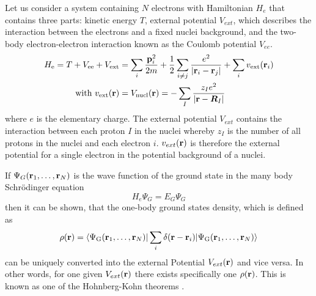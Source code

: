 	Let us consider a system containing $N$ electrons 
	with Hamiltonian $H_e$ 
	that contains three parts: kinetic energy $T$, external potential $V_{ext}$, which describes the interaction between the electrons and a fixed nuclei background, and the two-body electron-electron interaction known as the Coulomb potential $V_{ee}$.
	\begin{align}
		H_\text{e} = T + V_{\text{ee}} + V_{\text{ext}} &= \sum_i \frac{\textbf{p}^2_i}{2m} +
		\frac{1}{2} \sum_{i\neq j} \frac{e^2}{|\textbf{r}_i - \textbf{r}_j|} + \sum_i v_{\text{ext}}(\textbf{r}_i) \\
		\text{with} ~v_{\text{ext}}(\textbf{r}) &= V_{\text{nucl}}(\textbf{r})= -\sum_I \frac{z_I e^2}{|\textbf{r} - \boldsymbol{R}_I|}
	\end{align}	
	where $e$ is the elementary charge.
	The external potential $V_{ext}$ contains the interaction between each proton $I$ in the nuclei whereby $z_I$ is the number of all protons in the nuclei and each electron $i$. $v_{ext}(\textbf{r})$ is therefore the external potential for a single electron in the potential background of a nuclei. 

	If $\Psi_G(\textbf{r}_1,\dots,\textbf{r}_N)$ is the wave function of the ground state in the many body Schrödinger equation
	\begin{equation}
		H_e \Psi_G = E_G \Psi_G
	\end{equation}
	then it can be shown, that the one-body ground states density, which is defined as
	\begin{equation}
		 \rho(\textbf{r}) = \braket{\Psi_\text{G}(\textbf{r}_1,\dots,\textbf{r}_N)|\sum_i \delta (\textbf{r} -\textbf{r}_i)| \Psi_\text{G}(\textbf{r}_1,\dots,\textbf{r}_N)}
	\end{equation}
	can be uniquely converted into the external Potential $V_{ext}(\textbf{r})$ and vice versa. In other words, for one given $V_{ext}(\textbf{r})$ there exists specifically one $\rho(\textbf{r})$. This is known as one of the Hohnberg-Kohn theorems \cite{solid_state_book}. 
	
